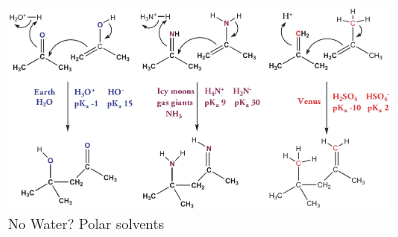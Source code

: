 \documentclass[]{article}
\begin{document}
\begin{figure}[H]
	\caption{No Water? Polar solvents}\label{fig:no:water}
	\includegraphics[width=0.9\textwidth]{NoWater}
\end{figure}
\end{document}
